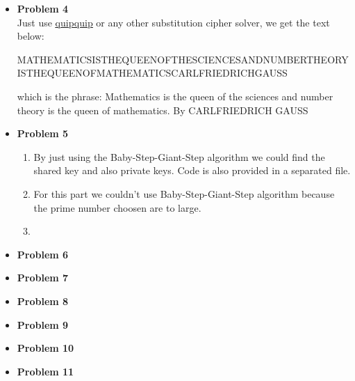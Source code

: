 \documentclass{article}
\begin{document}
\begin{itemize}
\begin{enumerate}[label=(\roman*)]
		\end{enumerate}
	\item{\textcolor{for}{\textbf{Problem 4}}}\\
		Just use \href{https://quipqiup.com/}{\underline{quipquip}} or any other substitution cipher solver, we get the text below:\\
		\begin{small}
			MATHEMATICSISTHEQUEENOFTHESCIENCESANDNUMBERTHEORYISTHEQUEENOFMATHEMATICSCARLFRIEDRICHGAUSS 
		\end{small}
		which is the phrase:
			Mathematics is the queen of the sciences and number theory is the queen of mathematics. By CARLFRIEDRICH GAUSS
	\item{\textcolor{for}{\textbf{Problem 5}}}
		\begin{enumerate}[label=(\alph*)]
			\item By just using the Baby-Step-Giant-Step algorithm we could find the shared key and also private keys.
				Code is also provided in a separated file.
			\item For this part we couldn't use Baby-Step-Giant-Step algorithm because the prime number choosen are to large.
			\item
		\end{enumerate}
	\item{\textcolor{for}{\textbf{Problem 6}}}
	\item{\textcolor{for}{\textbf{Problem 7}}}
	\item{\textcolor{for}{\textbf{Problem 8}}}
	\item{\textcolor{for}{\textbf{Problem 9}}}
	\item{\textcolor{for}{\textbf{Problem 10}}}
	\item{\textcolor{for}{\textbf{Problem 11}}}
\end{itemize}
\end{document}
